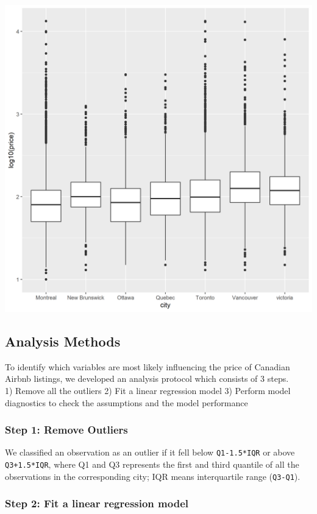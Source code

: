 \documentclass[
]{article}
\begin{document}
\includegraphics{../Images/Boxplot_of_price.png}

\hypertarget{analysis-methods}{%
\subsection{Analysis Methods}\label{analysis-methods}}

To identify which variables are most likely influencing the price of
Canadian Airbnb listings, we developed an analysis protocol which
consists of 3 steps.\\
1) Remove all the outliers 2) Fit a linear regression model 3) Perform
model diagnostics to check the assumptions and the model performance

\hypertarget{step-1-remove-outliers}{%
\subsubsection{Step 1: Remove Outliers}\label{step-1-remove-outliers}}

We classified an observation as an outlier if it fell below
\texttt{Q1-1.5*IQR} or above \texttt{Q3+1.5*IQR}, where Q1 and Q3
represents the first and third quantile of all the observations in the
corresponding city; IQR means interquartile range (\texttt{Q3-Q1}).

\hypertarget{step-2-fit-a-linear-regression-model}{%
\subsubsection{Step 2: Fit a linear regression
model}\label{step-2-fit-a-linear-regression-model}}
\end{document}
